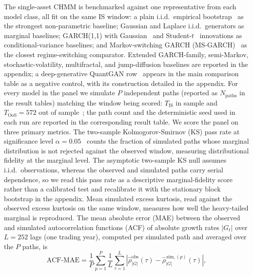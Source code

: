The single-asset CHMM is benchmarked against one representative from each model class, all fit on the same IS window: a plain i.i.d.\ empirical bootstrap~\cite{efron1979bootstrap} as the strongest non-parametric baseline; Gaussian and Laplace i.i.d.\ generators as marginal baselines; GARCH(1,1) with Gaussian~\cite{bollerslev1986generalized} and Student-$t$~\cite{bollerslev1987conditionally} innovations as conditional-variance baselines; and Markov-switching GARCH (MS-GARCH)~\cite{haas2004new} as the closest regime-switching comparator. Extended GARCH-family, semi-Markov, stochastic-volatility, multifractal, and jump-diffusion baselines are reported in the appendix; a deep-generative QuantGAN row~\cite{wiese2020quantgan} appears in the main comparison table as a negative control, with its construction detailed in the appendix. For every model in the panel we simulate $P$ independent paths (reported as $N_{\text{paths}}$ in the result tables) matching the window being scored: $T_{\text{IS}}$ in sample and $T_{\text{OoS}}=572$ out of sample~\cite{stenger2024thinking}; the path count and the deterministic seed used in each run are reported in the corresponding result table. We score the panel on three primary metrics. The two-sample Kolmogorov-Smirnov (KS) pass rate at significance level $\alpha = 0.05$~\cite{kolmogorov1933, smirnov1948} counts the fraction of simulated paths whose marginal distribution is not rejected against the observed window, measuring distributional fidelity at the marginal level. The asymptotic two-sample KS null assumes i.i.d.\ observations, whereas the observed and simulated paths carry serial dependence, so we read this pass rate as a descriptive marginal-fidelity score rather than a calibrated test and recalibrate it with the stationary block bootstrap in the appendix. Mean simulated excess kurtosis, read against the observed excess kurtosis on the same window, measures how well the heavy-tailed marginal is reproduced. The mean absolute error (MAE) between the observed and simulated autocorrelation functions (ACF) of absolute growth rates $|G_t|$ over $L = 252$ lags (one trading year), computed per simulated path and averaged over the $P$ paths, is
\begin{equation}
    \text{ACF-MAE} = \frac{1}{P}\sum_{p=1}^{P}\frac{1}{L}\sum_{\tau=1}^{L} \left| \hat\rho^{\text{obs}}_{|G|}(\tau) - \hat\rho^{\,\text{sim},(p)}_{|G|}(\tau) \right|,
    \label{eq:acf_mae}
\end{equation}
